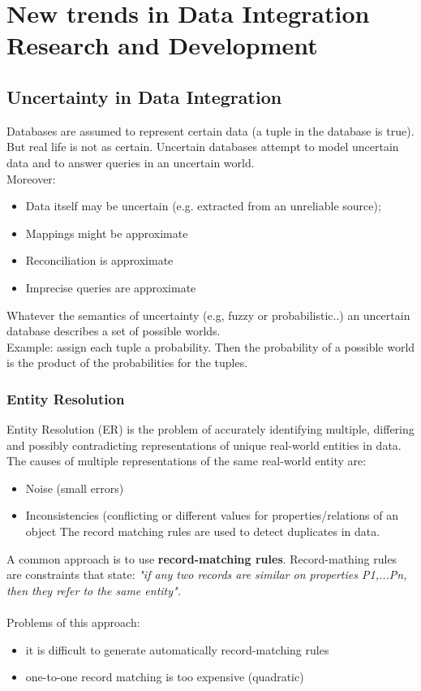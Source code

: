 \documentclass[10pt,a4paper]{article}
\newcommand{\nline}{\\~\\}
\begin{document}
\section{New trends in Data Integration Research and Development}
\subsection{Uncertainty in Data Integration}
Databases are assumed to represent certain data (a tuple in the database is true). But real life is not as certain. Uncertain databases attempt to model uncertain data and to answer queries in an uncertain world. \\Moreover:
\begin{itemize}
	\item Data itself may be uncertain (e.g. extracted from an unreliable source);
	\item Mappings might be approximate
	\item Reconciliation is approximate
	\item Imprecise queries are approximate
\end{itemize}
Whatever the semantics of uncertainty (e.g, fuzzy or probabilistic..) an uncertain database describes a set of possible worlds. \\
Example: assign each tuple a probability. Then the probability of a possible world is the product of the probabilities for the tuples.
\subsubsection{Entity Resolution}
Entity Resolution (ER) is the problem of accurately identifying multiple, differing and possibly contradicting representations of unique real-world entities in data. \\
The causes of multiple representations of the same real-world entity are:
\begin{itemize}
	\item Noise (small errors)
	\item Inconsistencies (conflicting or different values for properties/relations of an object The record matching rules are used to detect duplicates in data.
\end{itemize}
A common approach is to use \textbf{record-matching rules}. Record-mathing rules are constraints that state: \textit{"if any two records are similar on properties P1,...Pn, then they refer to the same entity".} \nline
Problems of this approach:
\begin{itemize}
	\item it is difficult to generate automatically record-matching rules
	\item one-to-one record matching is too expensive (quadratic)
\end{itemize}
\end{document}
